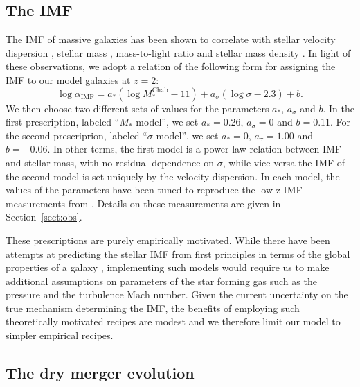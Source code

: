 \documentclass[usenatbib, letters]{mnras}
\def\mchab{M_*^{\mathrm{Chab}}}
\def\aimf{\alpha_{\mathrm{IMF}}}
\def\Sref#1{Section~\ref{#1}\xspace}
\begin{document}
\subsection{The IMF}
\label{ssect:imfform}

The IMF of massive galaxies has been shown to correlate with stellar velocity dispersion \citep[e.g.]{Tre++10, CvD12, LaB++13, Spi++14, Pos++15}, stellar mass \citep{Aug++10b, Son++15}, mass-to-light ratio \citep{Cap++12} and stellar mass density \citep{Spi++15}.
In light of these observations, we adopt a relation of the following form for assigning the IMF to our model galaxies at $z=2$:
\begin{equation}\label{eq:imfform}
\log{\aimf} = a_*(\log{\mchab} - 11) + a_\sigma(\log{\sigma} - 2.3) + b.
\end{equation}
We then choose two different sets of values for the parameters $a_*$, $a_\sigma$ and $b$. In the first prescription, labeled ``$M_*$ model'', we set $a_*=0.26$, $a_\sigma=0$ and $b=0.11$.
For the second prescriprion, labeled ``$\sigma$ model'', we set $a_*=0$, $a_\sigma=1.00$ and $b=-0.06$.
In other terms, the first model is a power-law relation between IMF and stellar mass, with no residual dependence on $\sigma$, while vice-versa the IMF of the second model is set uniquely by the velocity dispersion.
In each model, the values of the parameters have been tuned to reproduce the low-z IMF measurements from \citet{Son++15}. Details on these measurements are given in \Sref{sect:obs}.

These prescriptions are purely empirically motivated. While there have been attempts at predicting the stellar IMF from first principles in terms of the global properties of a galaxy \citep[e.g.]{Kru11,Hop12}, implementing such models would require us to make additional assumptions on parameters of the star forming gas such as the pressure and the turbulence Mach number.
Given the current uncertainty on the true mechanism determining the IMF, the benefits of employing such theoretically motivated recipes are modest and we therefore limit our model to simpler empirical recipes.


\subsection{The dry merger evolution}
\end{document}
